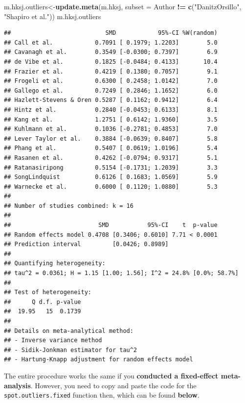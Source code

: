 \documentclass[]{book}
\newenvironment{Shaded}{\begin{snugshade}}{\end{snugshade}}
\newcommand{\DataTypeTok}[1]{\textcolor[rgb]{0.13,0.29,0.53}{#1}}
\newcommand{\KeywordTok}[1]{\textcolor[rgb]{0.13,0.29,0.53}{\textbf{#1}}}
\newcommand{\NormalTok}[1]{#1}
\newcommand{\OperatorTok}[1]{\textcolor[rgb]{0.81,0.36,0.00}{\textbf{#1}}}
\newcommand{\StringTok}[1]{\textcolor[rgb]{0.31,0.60,0.02}{#1}}
\begin{document}
\begin{Shaded}
\begin{Highlighting}[]
\NormalTok{m.hksj.outliers<-}\KeywordTok{update.meta}\NormalTok{(m.hksj,}
                             \DataTypeTok{subset =}\NormalTok{ Author }\OperatorTok{!=}\StringTok{ }\KeywordTok{c}\NormalTok{(}\StringTok{"DanitzOrsillo"}\NormalTok{,}
                                                  \StringTok{"Shapiro et al."}\NormalTok{))}
\NormalTok{m.hksj.outliers}
\end{Highlighting}
\end{Shaded}

\begin{verbatim}
##                           SMD            95%-CI %W(random)
## Call et al.            0.7091 [ 0.1979; 1.2203]        5.0
## Cavanagh et al.        0.3549 [-0.0300; 0.7397]        6.9
## de Vibe et al.         0.1825 [-0.0484; 0.4133]       10.4
## Frazier et al.         0.4219 [ 0.1380; 0.7057]        9.1
## Frogeli et al.         0.6300 [ 0.2458; 1.0142]        7.0
## Gallego et al.         0.7249 [ 0.2846; 1.1652]        6.0
## Hazlett-Stevens & Oren 0.5287 [ 0.1162; 0.9412]        6.4
## Hintz et al.           0.2840 [-0.0453; 0.6133]        8.1
## Kang et al.            1.2751 [ 0.6142; 1.9360]        3.5
## Kuhlmann et al.        0.1036 [-0.2781; 0.4853]        7.0
## Lever Taylor et al.    0.3884 [-0.0639; 0.8407]        5.8
## Phang et al.           0.5407 [ 0.0619; 1.0196]        5.4
## Rasanen et al.         0.4262 [-0.0794; 0.9317]        5.1
## Ratanasiripong         0.5154 [-0.1731; 1.2039]        3.3
## SongLindquist          0.6126 [ 0.1683; 1.0569]        5.9
## Warnecke et al.        0.6000 [ 0.1120; 1.0880]        5.3
## 
## Number of studies combined: k = 16
## 
##                         SMD           95%-CI    t  p-value
## Random effects model 0.4708 [0.3406; 0.6010] 7.71 < 0.0001
## Prediction interval         [0.0426; 0.8989]              
## 
## Quantifying heterogeneity:
## tau^2 = 0.0361; H = 1.15 [1.00; 1.56]; I^2 = 24.8% [0.0%; 58.7%]
## 
## Test of heterogeneity:
##      Q d.f. p-value
##  19.95   15  0.1739
## 
## Details on meta-analytical method:
## - Inverse variance method
## - Sidik-Jonkman estimator for tau^2
## - Hartung-Knapp adjustment for random effects model
\end{verbatim}

The entire procedure works the same if you \textbf{conducted a fixed-effect meta-analysis}. However, you need to copy and paste the code for the \texttt{spot.outliers.fixed} function then, which can be found \textbf{below}.
\end{document}
